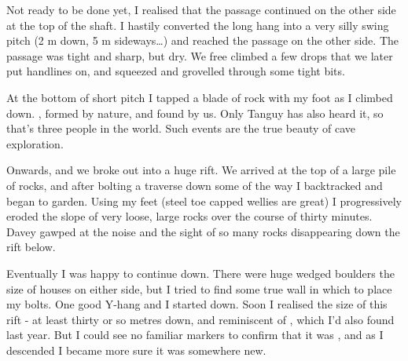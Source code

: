 Not ready to be done yet, I realised that the passage continued on the other side at the top of the shaft. I hastily converted the long hang into a very silly swing pitch (2 m down, 5 m sideways…)  and reached the passage on the other side. The passage was tight and sharp, but dry. We free climbed a few drops that we later put handlines on, and squeezed and grovelled through some tight bits.

At the bottom of short pitch I tapped a blade of rock with my foot as I climbed down. , formed by nature, and found by us. Only Tanguy has also heard it, so that’s three people in the world. Such events are the true beauty of cave exploration.


Onwards, and we broke out into a huge rift. We arrived at the top of a large pile of rocks, and after bolting a traverse down some of the way I backtracked and began to garden. Using my feet (steel toe capped wellies are great) I progressively eroded the slope of very loose, large rocks over the course of thirty minutes. Davey gawped at the noise and the sight of so many rocks disappearing down the rift below.

Eventually I was happy to continue down. There were huge wedged boulders the size of houses on either side, but I tried to find some true wall in which to place my bolts. One good Y-hang and I started down. Soon I realised the size of this rift - at least thirty or so metres down, and reminiscent of , which I’d also found last year. But I could see no familiar markers to confirm that it was , and as I descended I became more sure it was somewhere new.


